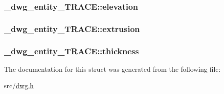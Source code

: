 \hypertarget{struct__dwg__entity__TRACE_ae30b5c8f7e1eb58ce77b45c567b9f5e2}{
\subsubsection[{elevation}]{ {\bf \-\_\-dwg\-\_\-entity\-\_\-\-T\-R\-A\-C\-E\-::elevation}}}\label{struct__dwg__entity__TRACE_ae30b5c8f7e1eb58ce77b45c567b9f5e2}
\hypertarget{struct__dwg__entity__TRACE_a509575be9fb4938790f53d6888273231}{
\subsubsection[{extrusion}]{ {\bf \-\_\-dwg\-\_\-entity\-\_\-\-T\-R\-A\-C\-E\-::extrusion}}}\label{struct__dwg__entity__TRACE_a509575be9fb4938790f53d6888273231}
\hypertarget{struct__dwg__entity__TRACE_af0619e0e7396b19ce9bfc23ccd863c77}{
\subsubsection[{thickness}]{ {\bf \-\_\-dwg\-\_\-entity\-\_\-\-T\-R\-A\-C\-E\-::thickness}}}\label{struct__dwg__entity__TRACE_af0619e0e7396b19ce9bfc23ccd863c77}


\-The documentation for this struct was generated from the following file\-:\begin{DoxyCompactItemize}
\item 
src/\hyperlink{dwg_8h}{dwg.\-h}\end{DoxyCompactItemize}

